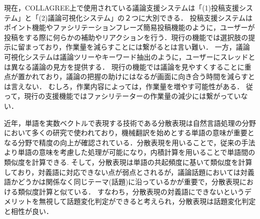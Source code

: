 現在，COLLAGREE上で使用されている議論支援システムは「(1)投稿支援システム」と「(2)議論可視化システム」の２つに大別できる．
投稿支援システムはポイント機能やファシリテーションフレーズ簡易投稿機能のように，ユーザーが投稿をする際に何らかの補助やリアクションを行う．現行の機能では選択肢の提示に留まっており，作業量を減らすことには繋がるとは言い難い．
一方，議論可視化システムは議論ツリーやキーワード抽出のように，ユーザーにスレッドとは異なる議論の見方を提供する．
現行の機能では議論を見やすくすることに重点が置かれており，議論の把握の助けにはなるが画面に向き合う時間を減らすとは言えない．
むしろ，作業内容によっては，作業量を増やす可能性がある．
従って，現行の支援機能ではファシリテーターの作業量の減少には繋がっていない．

近年，単語を実数ベクトルで表現する技術である分散表現は自然言語処理の分野において多くの研究で使われており，機械翻訳を始めとする単語の意味が重要となる分野で精度の向上が確認されている．分散表現を用いることで，従来の手法より単語の意味を考慮した処理が可能になり，内積計算を用いることで単語間の類似度を計算できる.
そして，分散表現は単語の共起頻度に基いて類似度を計算しており，対義語に対応できない点が弱点とされるが，議論話題においては対義語かどうかは関係なく同じテーマ(話題)に沿っているかが重要で，分散表現における類似度計算と似ている．
すなわち，分散表現の対義語にできないというデメリットを無視して話題変化判定ができると考えられ，分散表現は話題変化判定と相性が良い．

